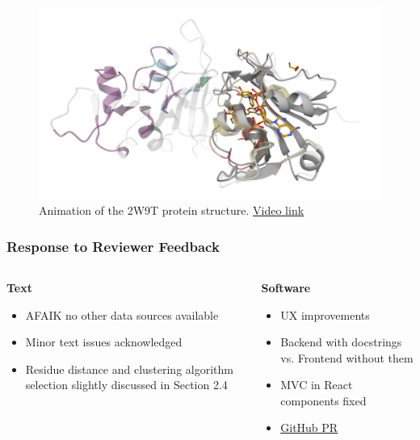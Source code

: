 \documentclass[aspectratio=169]{beamer}
\begin{document}
\begin{frame}
  \begin{figure}
    \centering
    \includegraphics[width=\linewidth,height=\textheight,keepaspectratio]{fig/screen4.png}
    \caption{Animation of the 2W9T protein structure. \textcolor{ITMOblue}{\href{http://lukaspolak.cz/files/animation.mov}{Video link}}}
  \end{figure}

\end{frame}

\begin{frame}[plain]
\end{frame}

\begin{frame}
  \frametitle{Response to Reviewer Feedback}
  \begin{columns}
    \begin{column}{0.5\textwidth}
      \textbf{Text}
      \begin{itemize}
        \item AFAIK no other data sources available
        \item Minor text issues acknowledged
        \item Residue distance and clustering algorithm selection slightly discussed in Section 2.4
      \end{itemize}
    \end{column}
    \begin{column}{0.5\textwidth}
      \textbf{Software}
      \begin{itemize}
        \item UX improvements
        \item Backend with docstrings vs. Frontend without them
        \item MVC in React components fixed
        \item \textcolor{ITMOblue}{\href{https://github.com/luk27official/cryptoshow/pull/1}{GitHub PR}}
      \end{itemize}
    \end{column}
  \end{columns}
\end{frame}

\begin{frame}[plain]
\end{frame}
\end{document}
